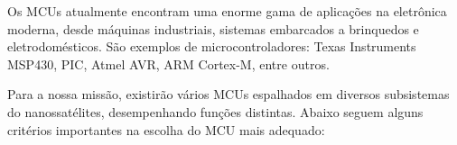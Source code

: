 Os MCUs atualmente encontram uma enorme gama de aplicações na eletrônica moderna, desde máquinas industriais, sistemas embarcados a brinquedos e eletrodomésticos. São exemplos de microcontroladores: Texas Instruments MSP430, PIC, Atmel AVR, ARM Cortex-M, entre outros.

\noindent
\begin{minipage}{\linewidth}
\label{uC_MSP430_sample_fig}
\end{minipage}

Para a nossa missão, existirão vários MCUs espalhados em diversos subsistemas do nanossatélites, desempenhando funções distintas. Abaixo seguem alguns critérios importantes na escolha do MCU mais adequado:

